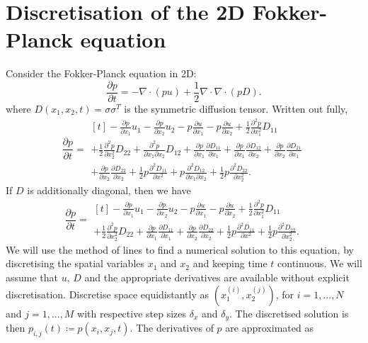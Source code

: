\chapter{Discretisation of the 2D Fokker-Planck equation}


Consider the Fokker-Planck equation in 2D:
$$
	\frac{\partial p}{\partial t} = -\nabla\cdot\left(pu\right) + \frac{1}{2}\nabla \cdot \nabla \cdot\left(pD\right).
$$
where $D(x_1, x_2, t) = \sigma\sigma^T$ is the symmetric diffusion tensor. Written out fully,
$$
	\frac{\partial p}{\partial t} = \begin{multlined}[t]
		- \frac{\partial p}{\partial x_1} u_1 - \frac{\partial p}{\partial x_2} u_2 - p\frac{\partial u}{\partial x_1} - p\frac{\partial u}{\partial x_2} + \frac12 \frac{\partial^2 p}{\partial x_1^2}D_{11} \\
		+ \frac12\frac{\partial^2p}{\partial x_2^2}D_{22} + \frac{\partial^2 p}{\partial x_1 \partial x_2}D_{12} + \frac{\partial p}{\partial x_1}\frac{\partial D_{11}}{\partial x_1} + \frac{\partial p}{\partial x_1}\frac{\partial D_{12}}{\partial x_2} + \frac{\partial p}{\partial x_2}\frac{\partial D_{21}}{\partial x_1} \\
		+ \frac{\partial p}{\partial x_2}\frac{\partial D_{22}}{\partial x_2} + \frac12p\frac{\partial^2 D_{11}}{\partial x^2} + p\frac{\partial^2 D_{12}}{\partial x_{1}\partial x_2} + \frac12 p\frac{\partial^2 D_{22}}{\partial x_2^2}.
	\end{multlined}
$$
If $D$ is additionally diagonal, then we have
$$
	\frac{\partial p}{\partial t} = \begin{multlined}[t]
		- \frac{\partial p}{\partial x_1} u_1 - \frac{\partial p}{\partial x_2} u_2 - p\frac{\partial u}{\partial x_1} - p\frac{\partial u}{\partial x_2} + \frac12 \frac{\partial^2 p}{\partial x_1^2}D_{11} \\
		+ \frac12\frac{\partial^2p}{\partial x_2^2}D_{22} + \frac{\partial p}{\partial x_1}\frac{\partial D_{11}}{\partial x_1}
		+ \frac{\partial p}{\partial x_2}\frac{\partial D_{22}}{\partial x_2} + \frac12p\frac{\partial^2 D_{11}}{\partial x^2} + \frac12 p\frac{\partial^2 D_{22}}{\partial x_2^2}.
	\end{multlined}
$$
We will use the method of lines to find a numerical solution to this equation, by discretising the spatial variables $x_1$ and $x_2$ and keeping time $t$ continuous. We will assume that $u$, $D$ and the appropriate derivatives are available without explicit discretisation.
Discretise space equidistantly as $\left(x_1^{(i)}, x_2^{(j)}\right)$, for $i = 1,...,N$ and $j = 1,...,M$ with respective step sizes $\delta_x$ and $\delta_y$. The discretised solution is then $p_{i,j}(t) \coloneqq p(x_i, x_j, t)$. The derivatives of $p$ are approximated as
